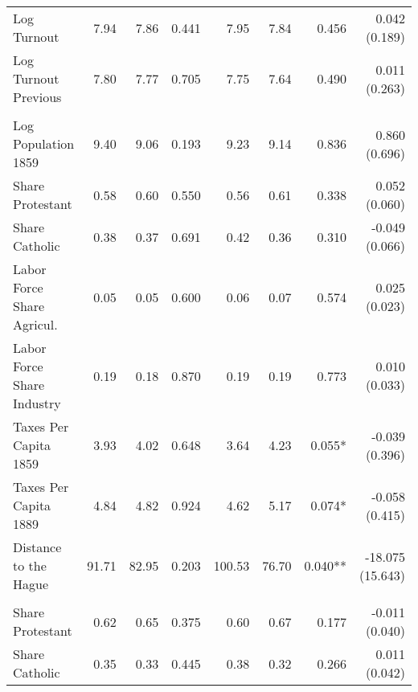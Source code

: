 \begin{table}[!h]
{\begin{threeparttable}
\begin{tabular}[t]{lrrrrrrr}
\hspace{1em}Log Turnout & \num{7.94} & \num{7.86} & 0.441 & \num{7.95} & \num{7.84} & 0.456 & 0.042 (0.189)\\
\hspace{1em}Log Turnout Previous & \num{7.80} & \num{7.77} & 0.705 & \num{7.75} & \num{7.64} & 0.490 & 0.011 (0.263)\\
\addlinespace[0.3em]
\multicolumn{8}{l}{\textbf{Panel D: Birthplace Characteristics}}\\
\hspace{1em}Log Population 1859 & \num{9.40} & \num{9.06} & 0.193 & \num{9.23} & \num{9.14} & 0.836 & 0.860 (0.696)\\
\hspace{1em}Share Protestant & \num{0.58} & \num{0.60} & 0.550 & \num{0.56} & \num{0.61} & 0.338 & 0.052 (0.060)\\
\hspace{1em}Share Catholic & \num{0.38} & \num{0.37} & 0.691 & \num{0.42} & \num{0.36} & 0.310 & -0.049 (0.066)\\
\hspace{1em}Labor Force Share Agricul. & \num{0.05} & \num{0.05} & 0.600 & \num{0.06} & \num{0.07} & 0.574 & 0.025 (0.023)\\
\hspace{1em}Labor Force Share Industry & \num{0.19} & \num{0.18} & 0.870 & \num{0.19} & \num{0.19} & 0.773 & 0.010 (0.033)\\
\hspace{1em}Taxes Per Capita 1859 & \num{3.93} & \num{4.02} & 0.648 & \num{3.64} & \num{4.23} & 0.055* & -0.039 (0.396)\\
\hspace{1em}Taxes Per Capita 1889 & \num{4.84} & \num{4.82} & 0.924 & \num{4.62} & \num{5.17} & 0.074* & -0.058 (0.415)\\
\hspace{1em}Distance to the Hague & \num{91.71} & \num{82.95} & 0.203 & \num{100.53} & \num{76.70} & 0.040** & -18.075 (15.643)\\
\addlinespace[0.3em]
\multicolumn{8}{l}{\textbf{Panel E: District Characteristics}}\\
\hspace{1em}Share Protestant & \num{0.62} & \num{0.65} & 0.375 & \num{0.60} & \num{0.67} & 0.177 & -0.011 (0.040)\\
\hspace{1em}Share Catholic & \num{0.35} & \num{0.33} & 0.445 & \num{0.38} & \num{0.32} & 0.266 & 0.011 (0.042)\\

\end{tabular}
\end{threeparttable}}
\end{table}
